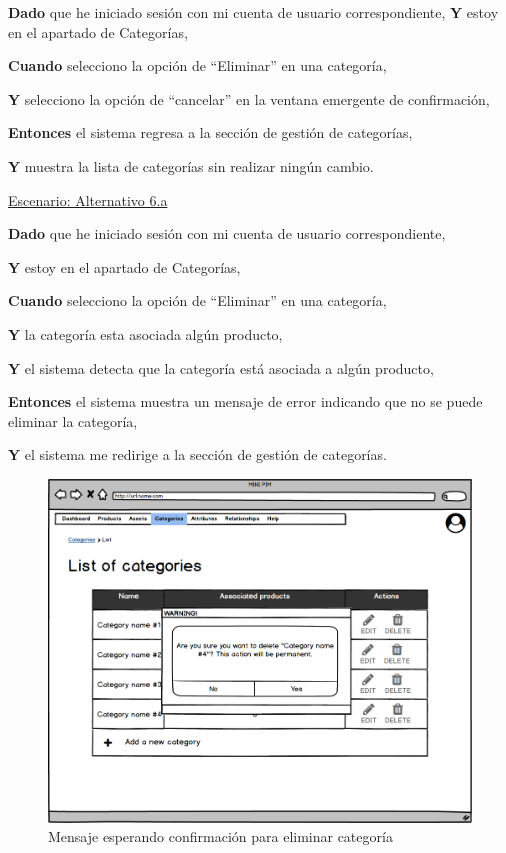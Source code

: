 \textbf{Dado} que he iniciado sesión con mi cuenta de usuario correspondiente,
\textbf{Y} estoy en el apartado de Categorías,\par
\textbf{Cuando} selecciono la opción de \enquote{Eliminar} en una categoría,\par
\textbf{Y} selecciono la opción de \enquote{cancelar} en la ventana emergente de confirmación,\par
\textbf{Entonces} el sistema regresa a la sección de gestión de categorías,\par
\textbf{Y} muestra la lista de categorías sin realizar ningún cambio.\par


\vspace{0.20cm}

\underline{Escenario: Alternativo 6.a}\par
\vspace{0.15cm}

\textbf{Dado} que he iniciado sesión con mi cuenta de usuario correspondiente,\par
\textbf{Y} estoy en el apartado de Categorías,\par
\textbf{Cuando} selecciono la opción de \enquote{Eliminar} en una categoría,\par
\textbf{Y} la categoría esta asociada algún producto,\par
\textbf{Y} el sistema detecta que la categoría está asociada a algún producto,\par
\textbf{Entonces} el sistema muestra un mensaje de error indicando que no se puede eliminar la categoría,\par
\textbf{Y} el sistema me redirige a la sección de gestión de categorías.\par


\vspace{0.20cm}

\begin{figure}[H]
    \includegraphics[width=1\linewidth]{mockups/RF4.4_1.png}
    \caption{Mensaje esperando confirmación para eliminar categoría}
   \end{figure}
\vspace{1.0cm}

